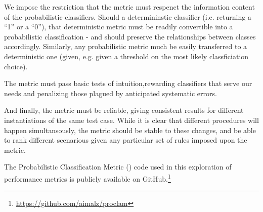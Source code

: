 We impose the restriction that the metric must respenct the information content of the probabilistic classifiers.
Should a determininstic classifier (i.e. returning a ``1'' or a ``0''), that deterministic metric must be readily convertible into a probabilistic classification - and should preserve the relationships between classes accordingly.
Similarly, any probabilistic metric much be easily transferred to a deterministic one (given, e.g. given a threshold on the most likely classficiation choice).

The metric must pass basic tests of intuition,rewarding classifiers that serve our needs and penalizing those plagued by anticipated systematic errors.

And finally, the metric must be reliable, giving consistent results for different instantiations of the same test case.
While it is clear that different procedures will happen simultansously, the metric should be stable to these changes, and be able to rank different scenarious given any particular set of rules imposed upon the metric.

The Probabilistic Classification Metric (\proclam) code used in this exploration of performance metrics is publicly available on GitHub.\footnote{\url{https://github.com/aimalz/proclam}}
